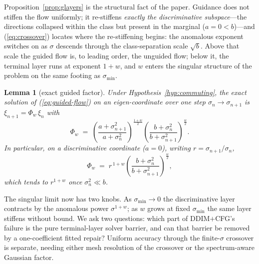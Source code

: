 \documentclass{article} %
\def\eqref#1{equation~\ref{#1}}
\theoremstyle{plain}
\newtheorem{lemma}{Lemma}
\theoremstyle{definition}
\theoremstyle{remark}
\providecommand{\dd}{\mathrm{d}}
\providecommand{\smin}{\sigma_{\min}}
\def\eqref#1{(\ref{#1})}
\newif\ifarxiv
\begin{document}
Proposition~\ref{prop:glayers} is the structural fact of the paper.
Guidance does not stiffen the flow uniformly; it re-stiffens \emph{exactly
the discriminative subspace}---the directions collapsed within the class but
present in the marginal ($a=0<b$)---and
\eqref{eq:crossover} locates where the re-stiffening begins: the anomalous
exponent switches on as $\sigma$ descends through the class-separation
scale $\sqrt b$. Above that scale the guided flow is, to leading order, the
unguided flow; below it, the terminal layer runs at exponent $1+w$, and $w$
enters the singular structure of the problem on the same footing as
$\smin$.

\begin{lemma}[exact guided factor]\label{lem:gfactor}
Under Hypothesis~\ref{hyp:commuting}, the exact solution of
\eqref{eq:guided-flow} on an eigen-coordinate over one step $\sigma_n \to
\sigma_{n+1}$ is $\xi_{n+1} = \Phi_w\,\xi_n$ with
\begin{equation}\label{eq:exact-factor}
  \Phi_w
  \;=\;
  \left(\frac{a+\sigma_{n+1}^2}{a+\sigma_n^2}\right)^{\!\frac{1+w}{2}}
  \left(\frac{b+\sigma_n^2}{b+\sigma_{n+1}^2}\right)^{\!\frac{w}{2}} .
\end{equation}
In particular, on a discriminative coordinate ($a=0$), writing $r =
\sigma_{n+1}/\sigma_n$,
\begin{equation}\label{eq:exact-disc}
  \Phi_w \;=\; r^{\,1+w}
  \left(\frac{b+\sigma_n^2}{b+\sigma_{n+1}^2}\right)^{\!\frac{w}{2}},
\end{equation}
which tends to $r^{1+w}$ once $\sigma_n^2 \ll b$.
\end{lemma}

\newcommand{\ProofGFactor}{%
Integrate \eqref{eq:mu}: $\int \mu_w \,\dd\log\sigma = \tfrac{1+w}{2}
\log(a+\sigma^2) - \tfrac{w}{2}\log(b+\sigma^2)$ up to a constant, since
$\dd\log(c+\sigma^2) = 2A_c\,\dd\log\sigma$ with $A_c =
\sigma^2/(c+\sigma^2)$. Exponentiate the increment.
}
\ifarxiv\begin{proof}\ProofGFactor\end{proof}\fi

The singular limit now has two knobs. As $\smin \to 0$ the discriminative
layer contracts by the anomalous power $\sigma^{1+w}$; as $w$ grows at
fixed $\smin$ the same layer stiffens without bound. We ask two questions:
which part of DDIM$+$CFG's failure is the pure terminal-layer solver barrier,
and can that barrier be removed by a one-coefficient fitted repair? Uniform
accuracy through the finite-$\sigma$ crossover is separate, needing either mesh
resolution of the crossover or the spectrum-aware Gaussian factor.
\end{document}
